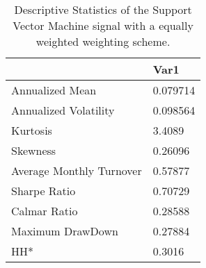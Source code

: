 \begin{table}[H]
\centering
\begin{tabular}{ll}
& Var1 \\ 
\hline 
Annualized Mean & 0.079714 \\ 
Annualized Volatility & 0.098564 \\ 
Kurtosis & 3.4089 \\ 
Skewness & 0.26096 \\ 
Average Monthly Turnover & 0.57877 \\ 
Sharpe Ratio & 0.70729 \\ 
Calmar Ratio & 0.28588 \\ 
Maximum DrawDown & 0.27884 \\ 
HH* & 0.3016 \\ 
\hline
\end{tabular}
\caption{Descriptive Statistics of the Support Vector Machine signal with a equally weighted weighting scheme.}
\label{SVM_MODEL_EW}
\end{table}